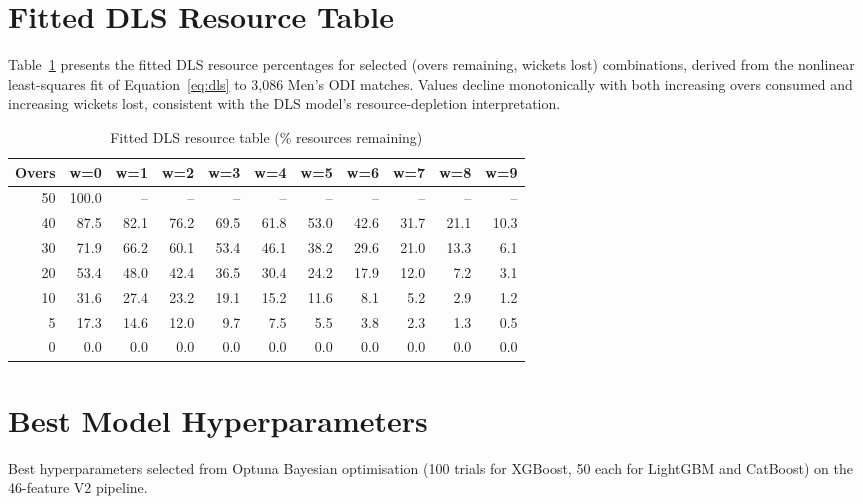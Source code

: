\documentclass[10pt,a4paper,twocolumn]{article}
\begin{document}
\appendix

\section{Fitted DLS Resource Table}
\label{app:resource_table}

Table~\ref{tab:resource_full} presents the fitted DLS resource percentages for selected (overs remaining, wickets lost) combinations, derived from the nonlinear least-squares fit of Equation~\ref{eq:dls} to 3,086 Men's ODI matches. Values decline monotonically with both increasing overs consumed and increasing wickets lost, consistent with the DLS model's resource-depletion interpretation.

\begin{table}[htbp]
\centering
\caption{Fitted DLS resource table (\% resources remaining)}
\label{tab:resource_full}
\tiny
\begin{tabular}{rrrrrrrrrrr}
\toprule
\textbf{Overs} & \textbf{w=0} & \textbf{w=1} & \textbf{w=2} & \textbf{w=3} & \textbf{w=4} & \textbf{w=5} & \textbf{w=6} & \textbf{w=7} & \textbf{w=8} & \textbf{w=9} \\
\midrule
50 & 100.0 & -- & -- & -- & -- & -- & -- & -- & -- & -- \\
40 & 87.5 & 82.1 & 76.2 & 69.5 & 61.8 & 53.0 & 42.6 & 31.7 & 21.1 & 10.3 \\
30 & 71.9 & 66.2 & 60.1 & 53.4 & 46.1 & 38.2 & 29.6 & 21.0 & 13.3 & 6.1 \\
20 & 53.4 & 48.0 & 42.4 & 36.5 & 30.4 & 24.2 & 17.9 & 12.0 & 7.2 & 3.1 \\
10 & 31.6 & 27.4 & 23.2 & 19.1 & 15.2 & 11.6 & 8.1 & 5.2 & 2.9 & 1.2 \\
5  & 17.3 & 14.6 & 12.0 & 9.7 & 7.5 & 5.5 & 3.8 & 2.3 & 1.3 & 0.5 \\
0  & 0.0 & 0.0 & 0.0 & 0.0 & 0.0 & 0.0 & 0.0 & 0.0 & 0.0 & 0.0 \\
\bottomrule
\end{tabular}
\end{table}

\section{Best Model Hyperparameters}
\label{app:hyperparams}

Best hyperparameters selected from Optuna Bayesian optimisation (100 trials for XGBoost, 50 each for LightGBM and CatBoost) on the 46-feature V2 pipeline.
\end{document}

